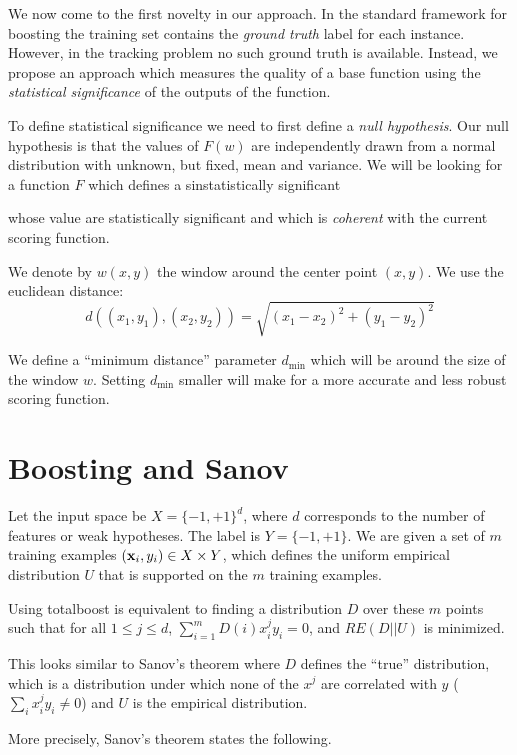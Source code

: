 \documentclass[11pt]{article}
\begin{document}
We now come to the first novelty in our approach. In the standard
framework for boosting the training set contains the {\em ground
  truth} label for each instance. However, in the tracking problem no
such ground truth is available. Instead, we propose an approach which
measures the quality of a base function using the {\em statistical
  significance} of the outputs of the function.

To define statistical significance we need to first define a {\em null
  hypothesis}. Our null hypothesis is that the values of $F(w)$ are
independently drawn from a normal distribution with unknown, but
fixed, mean and variance. We will be looking for a function $F$ which
defines a sinstatistically significant 

 whose
value are statistically significant and which is {\em coherent} with
the current scoring function.

We denote by $w(x,y)$ the window around the center point $(x,y)$.
We use the euclidean distance: 
\[
d((x_1,y_1),(x_2,y_2)) = \sqrt{(x_1-x_2)^2+(y_1-y_2)^2}
\]
\newcommand{\dmin}{d_{\mbox{min}}}
\newcommand{\xin}{x_{\mbox{in}}}
\newcommand{\xout}{x_{\mbox{out}}}
\newcommand{\yin}{y_{\mbox{in}}}
\newcommand{\yout}{y_{\mbox{out}}}

We define a ``minimum distance'' parameter $\dmin$ which will be
around the size of the window $w$. Setting $\dmin$ smaller will make
for a more accurate and less robust scoring function.

\section{Boosting and Sanov}
Let the input space be $X=\{-1,+1\}^d$, where $d$ corresponds to the
number of features or weak hypotheses. The label is $Y=\{-1,+1\}$.  We
are given a set of $m$ training examples $({\bf x}_i,y_i) \in X \times Y$, which
defines the uniform empirical distribution $U$ that is supported on
the $m$ training examples.

Using totalboost is equivalent to finding a distribution $D$ over
these $m$ points such that for all $1 \leq j \leq d$, $\sum_{i=1}^m
D(i) x^j_i y_i = 0$, and $RE(D||U)$ is minimized.

This looks similar to Sanov's theorem where $D$ defines the ``true''
distribution, which is a distribution under which none of the $x^j$
are correlated with $y$ ($\sum_i x^j_i y_i \neq 0$) and $U$ is the
empirical distribution.

\newcommand{\cH}{{\cal H}}
\newcommand{\cP}{{\cal P}_n}
More precisely, Sanov's theorem states the following.
\end{document}
